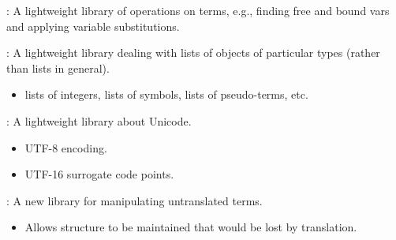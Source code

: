 
\begin{frame}

\newlibtitle

:
A lightweight library of operations on terms, e.g., finding free and
bound vars and applying variable substitutions.

\end{frame}


\begin{frame}

\newlibtitle

:
A lightweight library dealing with lists of objects of particular
types (rather than lists in general).
\begin{itemize}
\item lists of integers, lists of symbols, lists of pseudo-terms, etc.
\end{itemize}

\end{frame}


\begin{frame}

\newlibtitle

:
A lightweight library about Unicode.
\begin{itemize}
\item UTF-8 encoding.
\item UTF-16 surrogate code points.
\end{itemize}

\end{frame}


\begin{frame}

\newlibtitle

:
A new library for manipulating untranslated terms.
\begin{itemize}
\item Allows structure to be maintained that would be lost by translation.
\end{itemize}

\end{frame}

